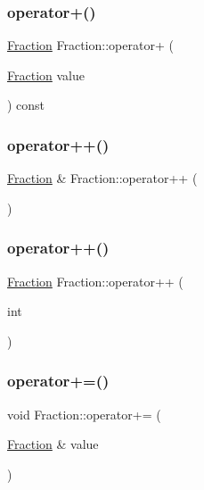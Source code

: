 \subsubsection{\texorpdfstring{operator+()}{operator+()}}
{\footnotesize\ttfamily \hyperlink{class_fraction}{Fraction} Fraction\+::operator+ (\begin{DoxyParamCaption}\item[{\hyperlink{class_fraction}{Fraction}}]{value }\end{DoxyParamCaption}) const}

\hypertarget{class_fraction_ac8ae2e81294340889183951be2657633}{}\label{class_fraction_ac8ae2e81294340889183951be2657633} 
\subsubsection{\texorpdfstring{operator++()}{operator++()}\hspace{0.1cm}{\footnotesize\ttfamily [1/2]}}
{\footnotesize\ttfamily \hyperlink{class_fraction}{Fraction} \& Fraction\+::operator++ (\begin{DoxyParamCaption}{ }\end{DoxyParamCaption})}

\hypertarget{class_fraction_a8fc2c460f8cf333d153da2f53a969edf}{}\label{class_fraction_a8fc2c460f8cf333d153da2f53a969edf} 
\subsubsection{\texorpdfstring{operator++()}{operator++()}\hspace{0.1cm}{\footnotesize\ttfamily [2/2]}}
{\footnotesize\ttfamily \hyperlink{class_fraction}{Fraction} Fraction\+::operator++ (\begin{DoxyParamCaption}\item[{int}]{ }\end{DoxyParamCaption})}

\hypertarget{class_fraction_ad2327333e6f9186984eb728a9243ad1a}{}\label{class_fraction_ad2327333e6f9186984eb728a9243ad1a} 
\subsubsection{\texorpdfstring{operator+=()}{operator+=()}}
{\footnotesize\ttfamily void Fraction\+::operator+= (\begin{DoxyParamCaption}\item[{\hyperlink{class_fraction}{Fraction} \&}]{value }\end{DoxyParamCaption})}

